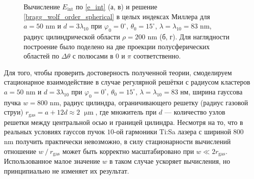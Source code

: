     \begin{figure}[ht]
        \hfil
        \hfil
        \caption{Вычисление $E_{\textrm{int}}$ по \autoref{e_int} (а, в) и решение \autoref{bragg_wolf_order_spherical} в целых индексах Миллера для $a = 50$ nm и $d = 3\lambda_{10}$ при $\varphi_0 = 0^{\circ}$, $\theta_0 = 15^{\circ}$, $\lambda = \lambda_{10} = 83$ nm, радиус цилиндрической области $\rho = 200$ nm (б, г). Для наглядности построение было поделено на две проекции полусферических областей по $\Delta \theta$ с полюсами в $0$ и $\pi$ соответственно.}\label{1st_check_diffrth:image}
    \end{figure}


Для того, чтобы проверить достоверность полученной теории, смоделируем стационарное взаимодействие в случае регулярной решётки с радиусом кластеров $a = 50$ nm и $d = 3\lambda_{10}$ при $\varphi_0 = 0^{\circ}$, $\theta_0 = 15^{\circ}$, $\lambda = \lambda_{10} = 83$ нм, ширина гауссова пучка $w = 800$ nm, радиус цилиндра, ограничивающего решетку (радиус газовой струи) $r_{\textrm{gas}} = a + 12d \approx 2$ $\upmu\textrm{m}$, где множитель при $d$ --- количество узлов решетки между центральной осью и границей цилиндра. Несмотря на то, что в реальных условиях гауссов пучок $10$-ой гармоники Ti:Sa лазера с шириной 800 nm получить практически невозможно, в силу стационарности вычислений отношение $w\:/\:r_{\textrm{gas}}$ может быть корректно масштабировано при $w \ll 2r_{\textrm{gas}}$. Использованное малое значение $w$ в таком случае ускоряет вычисления, но принципиально не изменяет их результат.

